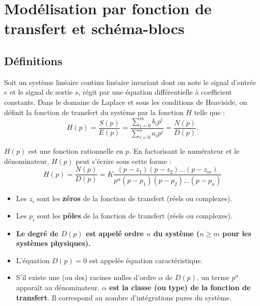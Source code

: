\section{Modélisation par fonction de transfert et schéma-blocs}

\subsection{Définitions}

\begin{defi}
Soit un système linéaire continu linéaire invariant dont on note le signal d'entrée $e$ et le signal de sortie $s$, régit par une équation différentielle à coefficient constants. Dans le domaine de Laplace et sous les conditions de Heaviside, on définit la fonction de transfert du système par la fonction $H$ telle que : 
$$
H(p)
=\dfrac{S(p)}{E(p)} 
= \dfrac{\sum\limits_{i=0}^{m} b_i p^i}{\sum\limits_{i=0}^{n} a_i p^i}
=\dfrac{N(p)}{D(p)}.
$$
 \end{defi}






\begin{defi}
$H(p)$ est une fonction rationnelle en $p$. En factorisant le numérateur et le
dénominateur, $H(p)$ peut s'écrire sous cette forme :
$$
H(p) = \dfrac{N(p)}{D(p)} =
K \dfrac{\left(p-z_1 \right)\left(p-z_2 \right)...\left(p-z_m \right)}{
p^{\alpha} \left(p-p_1 \right)\left(p-p_2 \right)...\left(p-p_n \right)}
$$

 \begin{itemize}
 \item Les $z_i$ sont les \textbf{zéros} de la fonction de transfert (réels ou
complexes).
\item Les $p_i$ sont les \textbf{pôles} de la fonction de transfert (réels ou
complexes).
\item \textbf{Le degré de $D(p)$ est appelé ordre $n$ du système ($n\geq m$ pour les
systèmes physiques).}
\item L'équation $D(p)=0$ est appelée équation caractéristique.
\item S'il existe une (ou des) racines nulles d'ordre $\alpha$ de $D(p)$, un
terme $p^\alpha$ apparaît au dénominateur. \textbf{$\alpha$ est la classe (ou type) de
la fonction de transfert}. Il correspond au nombre d'intégrations pures du
système.
\end{itemize}
\end{defi}



